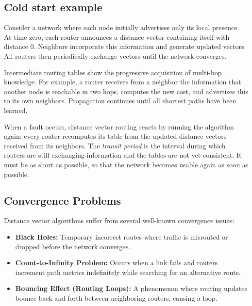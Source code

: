 \begin{center}
\end{center}

\subsection{Cold start example}

Consider a network where each node initially advertises only its local presence. At time zero, each router announces a distance vector containing itself with distance 0. Neighbors incorporate this information and generate updated vectors. All routers then periodically exchange vectors until the network converges.

\begin{center}
\end{center}


Intermediate routing tables show the progressive acquisition of multi-hop knowledge. For example, a router receives from a neighbor the information that another node is reachable in two hops, computes the new cost, and advertises this to its own neighbors. Propagation continues until all shortest paths have been learned.

When a fault occurs, distance vector routing reacts by running the algorithm
again: every router recomputes its table from the updated distance vectors
received from its neighbors. The \emph{transit period} is the interval during
which routers are still exchanging information and the tables are not yet
consistent. It must be as short as possible, so that the network becomes usable
again as soon as possible.
\subsection{Convergence Problems}

Distance vector algorithms suffer from several well-known convergence issues:

\begin{itemize}
	\item \textbf{Black Holes:} Temporary incorrect routes where traffic is misrouted or dropped before the network converges.
	\item \textbf{Count-to-Infinity Problem:} Occurs when a link fails and routers increment path metrics indefinitely while searching for an alternative route.
	\item \textbf{Bouncing Effect (Routing Loops):} A phenomenon where routing updates bounce back and forth between neighboring routers, causing a loop.
\end{itemize}

